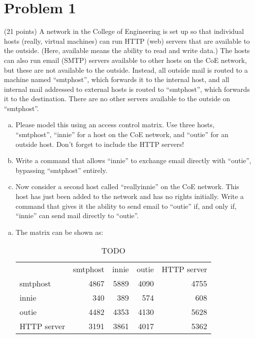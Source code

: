 
\section*{Problem 1}
(21 points) A network in the College of Engineering is set up so that individual hosts (really, virtual machines) can run HTTP (web) servers that are available to the outside. 
(Here, available means the ability to read and write data.) 
The hosts can also run email (SMTP) servers available to other hosts on the CoE network, but these are not available to the outside. Instead, all outside mail is routed to a machine named ``smtphost'', which forwards it to the internal host, and all internal mail addressed to external hosts is routed to ``smtphost'', which forwards it to the destination. There are no other servers available to the outside on ``smtphost''.

\begin{enumerate}[(a)]
	\item Please model this using an access control matrix. Use three hosts, ``smtphost'', ``innie'' for a host on the CoE network, and ``outie'' for an outside host. Don’t forget to include the HTTP servers!
	\item Write a command that allows ``innie'' to exchange email directly with ``outie'', bypassing ``smtphost'' entirely.
	\item Now consider a second host called ``reallyinnie'' on the CoE network. This host has just been added to the network and has no rights initially. Write a command that gives it the ability to send email to ``outie'' if, and only if, ``innie'' can send mail directly to ``outie''.
\end{enumerate}

\begin{enumerate}[(a)]
    \item The matrix can be shown as:
	

\begin{table*}[htbp]
	\caption{ TODO
	}
	\centering
	\begin{tabular}{lrrrr}
	  \toprule
	   & {smtphost} & {innie} & {outie} & {HTTP server}  \\
  
	  \cmidrule(lr){1-5}
  
	  {smtphost}                  & 4867  & 5889    & 4090     & 4755               \\
	  {innie}                    & 340   & 389     & 574      & 608                \\
	  {outie}                       & 4482  & 4353    & 4130     & 5628               \\
	  {HTTP server}                  & 3191  & 3861    & 4017     & 5362               \\
	  
	  \bottomrule
	\end{tabular}
	\label{tbl:realworld}
  \end{table*}
	
\end{enumerate}


